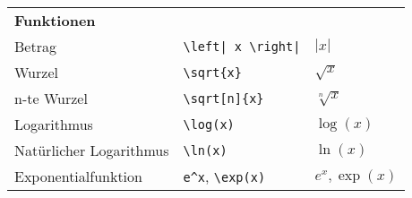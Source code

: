 \begin{table}[H]
\begin{longtable}{>{\raggedright}p{4cm} >{\raggedright}p{6cm} >{\raggedright}p{5cm}}
        \textbf{Funktionen}                                  &                                                                                         &                                      \\
        Betrag                                               & \texttt{\textbackslash left| x \textbackslash right|}                                   & $ \left| x \right| $                 \\
        Wurzel                                               & \texttt{\textbackslash sqrt\{x\}}                                                       & $ \sqrt{x} $                         \\
        n-te Wurzel                                          & \texttt{\textbackslash sqrt[n]\{x\}}                                                    & $ \sqrt[n]{x} $                      \\
        Logarithmus                                          & \texttt{\textbackslash log{(x)}}                                                        & $ \log{(x)} $                        \\
        Natürlicher Logarithmus                              & \texttt{\textbackslash ln{(x)}}                                                         & $ \ln{(x)} $                         \\
        Exponentialfunktion                                  & \texttt{e\^{}x}, \texttt{\textbackslash exp{(x)}}                                       & $ e^x, \exp{(x)} $                   \\


\end{longtable}
\end{table}
